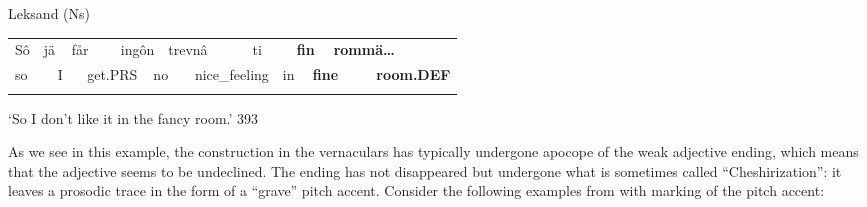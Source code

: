 \begin{listWWNumileveli}
\item {}

\begin{styleExample}
\label{bkm:Ref140985874}Leksand (Ns)

\end{styleExample}

\end{listWWNumileveli}

\begin{tabular}{llllllllllllllll}
\lsptoprule
Sô & \multicolumn{2}{l}{jä

} & \multicolumn{2}{l}{får

} & \multicolumn{2}{l}{ingôn

} & \multicolumn{2}{l}{trevnâ

} & \multicolumn{2}{l}{ti

} & \multicolumn{2}{l}{{\bfseries fin}

} & \multicolumn{2}{l}{{\bfseries rommä…}

} & \\
\multicolumn{2}{l}{so

} & \multicolumn{2}{l}{I

} & \multicolumn{2}{l}{get.PRS

} & \multicolumn{2}{l}{no

} & \multicolumn{2}{l}{nice\_feeling

} & \multicolumn{2}{l}{in

} & \multicolumn{2}{l}{{\bfseries fine}

} & \multicolumn{2}{l}{{\bfseries room.DEF}

}\\
\lspbottomrule
\end{tabular}

\begin{styleTranslation}
‘So I don’t like it in the fancy room.’ 393

\end{styleTranslation}

\begin{styleBodyTextFirst}
As we see in this example, the construction in the vernaculars has typically undergone apocope of the weak adjective ending, which means that the adjective seems to be undeclined. The ending has not disappeared but undergone what is sometimes called “Cheshirization”: it leaves a prosodic trace in the form of a “grave” pitch accent. Consider the following examples from \citet[148]{Levander1928} with marking of the pitch accent:

\end{styleBodyTextFirst}

